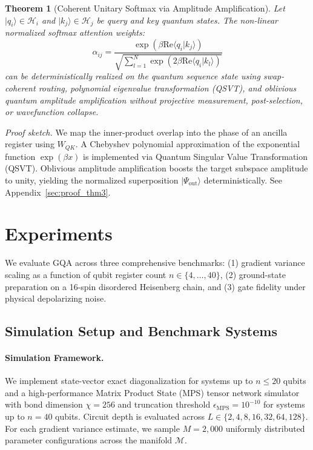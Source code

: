 \documentclass{article}
\newtheorem{theorem}{Theorem}
\begin{document}
\begin{theorem}[Coherent Unitary Softmax via Amplitude Amplification]
\label{thm:coherent_softmax}
Let $|q_i\rangle \in \mathcal{H}_i$ and $|k_j\rangle \in \mathcal{H}_j$ be query and key quantum states. The non-linear normalized softmax attention weights:
\begin{equation}
\alpha_{ij} = \frac{\exp(\beta \mathrm{Re}\langle q_i | k_j \rangle)}{\sqrt{\sum_{l=1}^N \exp(2\beta \mathrm{Re}\langle q_i | k_l \rangle)}}
\label{eq:coherent_softmax_weights}
\end{equation}
can be deterministically realized on the quantum sequence state using swap-coherent routing, polynomial eigenvalue transformation (QSVT), and oblivious quantum amplitude amplification without projective measurement, post-selection, or wavefunction collapse.
\end{theorem}
\emph{Proof sketch.} We map the inner-product overlap into the phase of an ancilla register using $W_{QK}$. A Chebyshev polynomial approximation of the exponential function $\exp(\beta x)$ is implemented via Quantum Singular Value Transformation (QSVT). Oblivious amplitude amplification boosts the target subspace amplitude to unity, yielding the normalized superposition $|\Psi_{\mathrm{out}}\rangle$ deterministically. See Appendix~\ref{sec:proof_thm3}.

\section{Experiments}
\label{sec:experiments}

We evaluate GQA across three comprehensive benchmarks: (1) gradient variance scaling as a function of qubit register count $n \in \{4, \dots, 40\}$, (2) ground-state preparation on a 16-spin disordered Heisenberg chain, and (3) gate fidelity under physical depolarizing noise.

\subsection{Simulation Setup and Benchmark Systems}
\label{sec:exp_setup}

\paragraph{Simulation Framework.} We implement state-vector exact diagonalization for systems up to $n \le 20$ qubits and a high-performance Matrix Product State (MPS) tensor network simulator with bond dimension $\chi = 256$ and truncation threshold $\epsilon_{\mathrm{MPS}} = 10^{-10}$ for systems up to $n=40$ qubits. Circuit depth is evaluated across $L \in \{2, 4, 8, 16, 32, 64, 128\}$. For each gradient variance estimate, we sample $M = 2{,}000$ uniformly distributed parameter configurations across the manifold $\mathcal{M}$.
\end{document}
